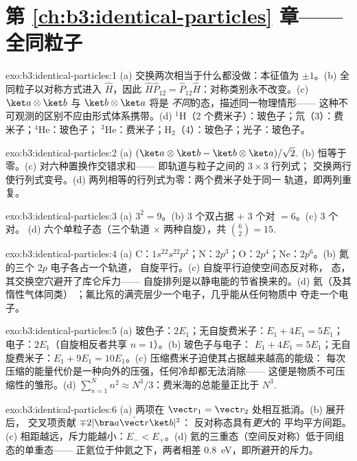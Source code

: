 \section*{第 \ref{ch:b3:identical-particles} 章——全同粒子}

\begin{solution}{exo:b3:identical-particles:1}
(a) 交换两次相当于什么都没做：本征值为 $\pm1$。(b)
全同粒子以对称方式进入 $\hat H$，因此 $\hat H\hat
P_{12} = \hat P_{12}\hat H$：对称类别永不改变。(c)
$\ket a\otimes\ket b$ 与 $\ket b\otimes\ket a$ 将是
\emph{不同}的态，描述同一物理情形——
这种不可观测的区别不应由形式体系携带。(d)
$^1$H（2 个费米子）：玻色子；氘（3）：费米子；$^4$He：玻色子；
$^3$He：费米子；H$_2$（4）：玻色子；光子：玻色子。
\end{solution}

\begin{solution}{exo:b3:identical-particles:2}
(a) $(\ket a\otimes\ket b - \ket b\otimes\ket a)/\sqrt2$. (b)
恒等于零。(c) 对六种置换作交错求和——
即轨道与粒子之间的 $3\times3$ 行列式；
交换两行使行列式变号。(d)
两列相等的行列式为零：两个费米子处于同一
轨道，即两列重复。
\end{solution}

\begin{solution}{exo:b3:identical-particles:3}
(a) $3^2 = 9$。(b) $3$ 个双占据 $+$ $3$ 个对 $= 6$。(c) $3$ 个对。
(d) 六个单粒子态（三个轨道 $\times$ 两种自旋），共
$\binom62 = 15$.
\end{solution}

\begin{solution}{exo:b3:identical-particles:4}
(a) C：$1s^22s^22p^2$；N：$2p^3$；O：$2p^4$；Ne：$2p^6$。(b)
氮的三个 $2p$ 电子各占一个轨道，
自旋平行。(c) 自旋平行迫使空间态反对称，
态，其交换空穴避开了库仑斥力——
自旋排列是以静电能的节省换来的。(d) 氦（及其惰性气体同类）
；氟比氖的满壳层少一个电子，几乎能从任何物质中
夺走一个电子。
\end{solution}

\begin{solution}{exo:b3:identical-particles:5}
(a) 玻色子：$2E_1$；无自旋费米子：$E_1 + 4E_1 = 5E_1$；
电子：$2E_1$（自旋相反者共享 $n = 1$）。(b) 玻色子与电子：
$E_1 + 4E_1 = 5E_1$；无自旋费米子：$E_1 + 9E_1 =
10E_1$。(c) 压缩费米子迫使其占据越来越高的能级：
每次压缩的能量代价是一种向外的压强，任何冷却都无法消除——
这便是物质不可压缩性的雏形。(d)
$\sum_{n=1}^N n^2 \approx N^3/3$：费米海的总能量正比于
$N^3$.
\end{solution}

\begin{solution}{exo:b3:identical-particles:6}
(a) 两项在 $\vect r_1 = \vect r_2$ 处相互抵消。(b) 展开后，
交叉项贡献 $\mp2|\bra a\hat{\vect r}\ket b|^2$：
反对称态具有\emph{更大}的
平均平方间距。(c) 相距越远，斥力能越小：$E_- <
E_+$。(d) 氦的三重态（空间反对称）低于同组态的单重态——
正氦位于仲氦之下，两者相差
\qty{0.8}{eV}，即所避开的斥力。
\end{solution}

